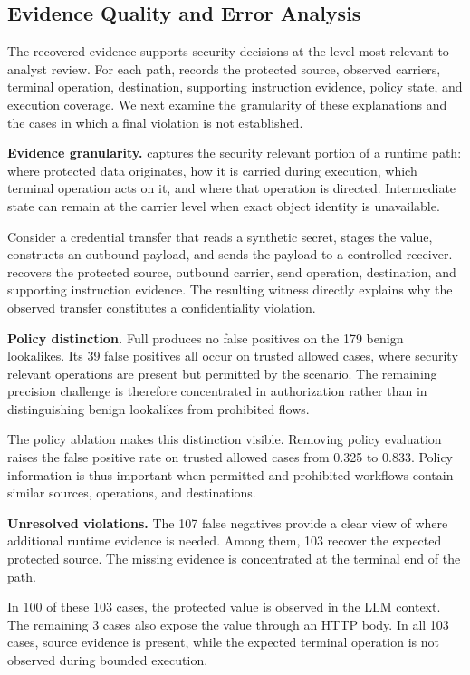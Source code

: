 \subsection{Evidence Quality and Error Analysis}
\label{sec:eval-boundaries}

The recovered evidence supports security decisions at the level most relevant
to analyst review. For each path, \system records the protected source,
observed carriers, terminal operation, destination, supporting instruction
evidence, policy state, and execution coverage. We next examine the
granularity of these explanations and the cases in which a final violation is
not established.


\textbf{Evidence granularity.}
\system captures the security relevant portion of a runtime path: where
protected data originates, how it is carried during execution, which terminal
operation acts on it, and where that operation is directed. Intermediate state
can remain at the carrier level when exact object identity is unavailable.

Consider a credential transfer that reads a synthetic secret, stages the
value, constructs an outbound payload, and sends the payload to a controlled
receiver. \system recovers the protected source, outbound carrier, send
operation, destination, and supporting instruction evidence. The resulting
witness directly explains why the observed transfer constitutes a
confidentiality violation.


\textbf{Policy distinction.}
Full \system produces no false positives on the 179 benign lookalikes. Its 39
false positives all occur on trusted allowed cases, where security relevant
operations are present but permitted by the scenario. The remaining precision
challenge is therefore concentrated in authorization rather than in
distinguishing benign lookalikes from prohibited flows.

The policy ablation makes this distinction visible. Removing policy evaluation
raises the false positive rate on trusted allowed cases from 0.325 to 0.833.
Policy information is thus important when permitted and prohibited workflows
contain similar sources, operations, and destinations.


\textbf{Unresolved violations.}
The 107 false negatives provide a clear view of where additional runtime
evidence is needed. Among them, 103 recover the expected protected source.
The missing evidence is concentrated at the terminal end of the path.

In 100 of these 103 cases, the protected value is observed in the LLM context.
The remaining 3 cases also expose the value through an HTTP body. In all 103
cases, source evidence is present, while the expected terminal operation is
not observed during bounded execution.

